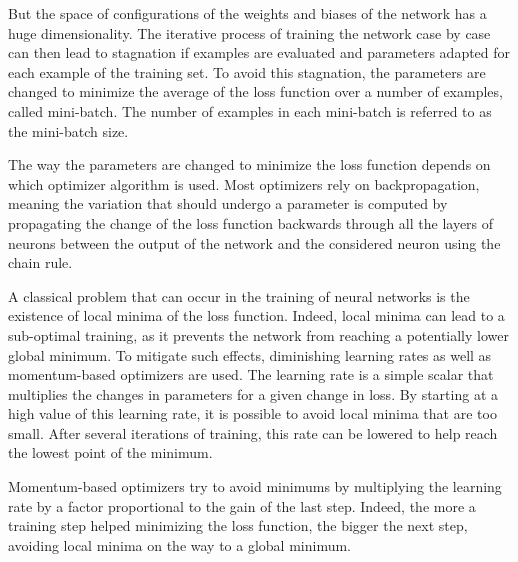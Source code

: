 But the space of configurations of the weights and biases of the network has a huge dimensionality. The iterative process of training the network case by case can then lead to stagnation if examples are evaluated and parameters adapted for each example of the training set. To avoid this stagnation, the parameters are changed to minimize the average of the loss function over a number of examples, called mini-batch. The number of examples in each mini-batch is referred to as the mini-batch size.

The way the parameters are changed to minimize the loss function depends on which optimizer algorithm is used. Most optimizers rely on backpropagation, meaning the variation that should undergo a parameter is computed by propagating the change of the loss function backwards through all the layers of neurons between the output of the network and the considered neuron using the chain rule.\newline


A classical problem that can occur in the training of neural networks is the existence of local minima of the loss function. Indeed, local minima can lead to a sub-optimal training, as it prevents the network from reaching a potentially lower global minimum. To mitigate such effects, diminishing learning rates as well as momentum-based optimizers are used. The learning rate is a simple scalar that multiplies the changes in parameters for a given change in loss. By starting at a high value of this learning rate, it is possible to avoid local minima that are too small. After several iterations of training, this rate can be lowered to help reach the lowest point of the minimum. 

Momentum-based optimizers try to avoid minimums by multiplying the learning rate by a factor proportional to the gain of the last step. Indeed, the more a training step helped minimizing the loss function, the bigger the next step, avoiding local minima on the way to a global minimum.\newline

